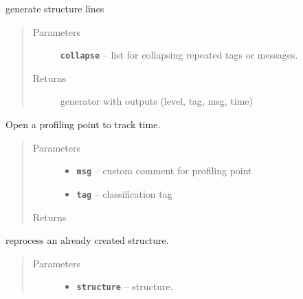 \documentclass[letterpaper,10pt,english]{sphinxmanual}
\begin{document}
\begin{fulllineitems}

\begin{fulllineitems}
\label{RRtoolbox.lib:RRtoolbox.lib.root.profiler.lines_unformatted}
generate structure lines
\begin{quote}\begin{description}
\item[{Parameters}] \leavevmode
\textbf{\texttt{collapse}} -- list for collapsing repeated tags or messages.

\item[{Returns}] \leavevmode
generator with outputs (level, tag, msg, time)

\end{description}\end{quote}

\end{fulllineitems}


\begin{fulllineitems}
\label{RRtoolbox.lib:RRtoolbox.lib.root.profiler.open_point}
Open a profiling point to track time.
\begin{quote}\begin{description}
\item[{Parameters}] \leavevmode\begin{itemize}
\item {} 
\textbf{\texttt{msg}} -- custom comment for profiling point

\item {} 
\textbf{\texttt{tag}} -- classification tag

\end{itemize}

\item[{Returns}] \leavevmode


\end{description}\end{quote}

\end{fulllineitems}


\begin{fulllineitems}
\label{RRtoolbox.lib:RRtoolbox.lib.root.profiler.restructure}
reprocess an already created structure.
\begin{quote}\begin{description}
\item[{Parameters}] \leavevmode\begin{itemize}
\item {} 
\textbf{\texttt{structure}} -- structure.


\end{itemize}
\end{description}
\end{quote}
\end{fulllineitems}
\end{fulllineitems}
\end{document}
